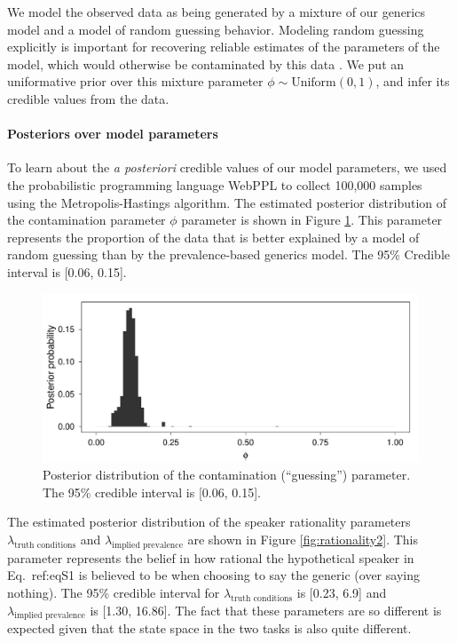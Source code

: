 \documentclass[10pt,letterpaper]{article}
\begin{document}
We model the observed data as being generated by a mixture of our generics model and a model of random guessing behavior. 
Modeling random guessing explicitly is important for recovering reliable estimates of the parameters of the model, which would otherwise be contaminated by this data \cite{LW2014}.
We put an uniformative prior over this mixture parameter $\phi \sim \text{Uniform}(0,1)$, and infer its credible values from the data.

\paragraph{Posteriors over model parameters}

To learn about the \emph{a posteriori} credible values of our model parameters, we used the probabilistic programming language WebPPL \cite{dippl} to collect 100,000 samples using the Metropolis-Hastings algorithm. 
The estimated posterior distribution of the contamination parameter $\phi$ parameter is shown in Figure \ref{fig:phi2}. 
This parameter represents the proportion of the data that is better explained by a model of random guessing than by the prevalence-based generics model. 
The 95\% Credible interval is [0.06, 0.15]. 

\begin{figure}
\centering
    \includegraphics[width=0.8\columnwidth]{asym-phi-2opts-phi-100k.pdf}
    \caption{Posterior distribution of the contamination (``guessing'') parameter. The 95\% credible interval is [0.06, 0.15].}
  \label{fig:phi2}
\end{figure}

The estimated posterior distribution of the speaker rationality parameters $\lambda_{\text{truth conditions}}$ and $\lambda_{\text{implied prevalence}}$ are shown in Figure \ref{fig:rationality2}. 
This parameter represents the belief in how rational the hypothetical speaker in Eq.~{ref:eqS1} is believed to be when choosing to say the generic (over saying nothing). 
The 95\% credible interval for $\lambda_{\text{truth conditions}}$ is [0.23, 6.9] and $\lambda_{\text{implied prevalence}}$ is [1.30, 16.86]. The fact that these parameters are so different is expected given that the state space in the two tasks is also quite different.
\end{document}
